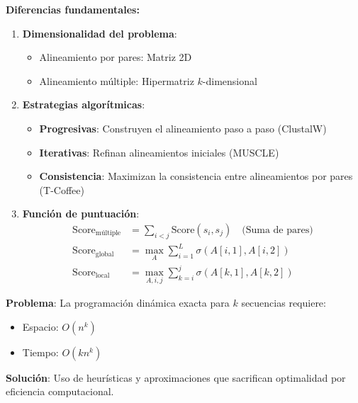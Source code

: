 \documentclass[fleqn,10pt]{article}
\begin{document}
\textbf{Diferencias fundamentales:}

\begin{enumerate}[label=\textbf{\Roman*.}]
    \item \textbf{Dimensionalidad del problema}:
    \begin{itemize}
        \item Alineamiento por pares: Matriz 2D
        \item Alineamiento múltiple: Hipermatriz $k$-dimensional
    \end{itemize}
    
    \item \textbf{Estrategias algorítmicas}:
    \begin{itemize}
        \item \textbf{Progresivas}: Construyen el alineamiento paso a paso (ClustalW)
        \item \textbf{Iterativas}: Refinan alineamientos iniciales (MUSCLE)
        \item \textbf{Consistencia}: Maximizan la consistencia entre alineamientos por pares (T-Coffee)
    \end{itemize}
    
    \item \textbf{Función de puntuación}:
    \begin{align}
        \text{Score}_{\text{múltiple}} &= \sum_{i<j} \text{Score}(s_i, s_j) \quad \text{(Suma de pares)} \\
        \text{Score}_{\text{global}} &= \max_{A} \sum_{i=1}^{L} \sigma(A[i,1], A[i,2]) \\
        \text{Score}_{\text{local}} &= \max_{A,i,j} \sum_{k=i}^{j} \sigma(A[k,1], A[k,2])
    \end{align}
\end{enumerate}

\begin{tcolorbox}[breakable, colback=red!5!white,colframe=red!75!black,title=Limitaciones Computacionales]
\textbf{Problema}: La programación dinámica exacta para $k$ secuencias requiere:
\begin{itemize}
    \item Espacio: $O(n^k)$
    \item Tiempo: $O(kn^k)$
\end{itemize}

\textbf{Solución}: Uso de heurísticas y aproximaciones que sacrifican optimalidad por eficiencia computacional.
\end{tcolorbox}
\newpage
\end{document}
